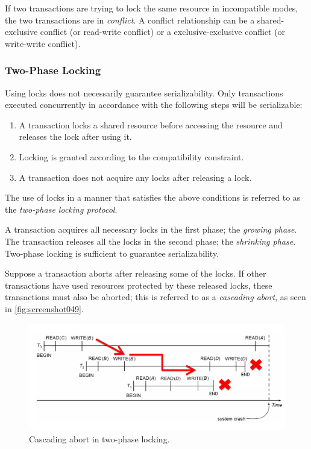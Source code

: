If two transactions are trying to lock the same resource in incompatible modes, the two transactions are in \textit{conflict}. A conflict relationship can be a shared-exclusive conflict (or read-write conflict) or a exclusive-exclusive conflict (or write-write conflict).

\subsubsection{Two-Phase Locking}
Using locks does not necessarily guarantee serializability. Only transactions executed concurrently in accordance with the following steps will be serializable: \begin{enumerate}
\item A transaction locks a shared resource before accessing the resource and releases the lock after using it.
\item Locking is granted according to the compatibility constraint.
\item A transaction does not acquire any locks after releasing a lock.
\end{enumerate}
The use of locks in a manner that satisfies the above conditions is referred to as the \textit{two-phase locking protocol}.

A transaction acquires all necessary locks in the first phase; the \textit{growing phase}. The transaction releases all the locks in the second phase; the \textit{shrinking phase}. Two-phase locking is sufficient to guarantee serializability.

Suppose a transaction aborts after releasing some of the locks. If other transactions have used resources protected by these released locks, these transactions must also be aborted; this is referred to as a \textit{cascading abort}, as seen in \autoref{fig:screenshot049}.

\begin{figure}
\centering
\includegraphics[width=0.7\linewidth]{figures/screenshot049}
\caption{Cascading abort in two-phase locking.}
\label{fig:screenshot049}
\end{figure}

